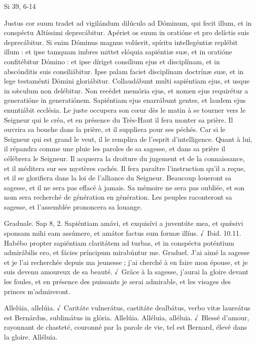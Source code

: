 \begin{paracol}{2}
Si 39, 6-14
\switchcolumn

\switchcolumn*

Justus cor suum tradet ad  vigilándum dilúculo ad Dóminum, qui fecit illum, et in conspéctu Altíssimi deprecábitur. Apériet os suum in oratióne et pro delíctis suis deprecábitur. Si enim Dóminus magnus volúerit, spíritu intellegéntiæ replébit illum : et ipse tamquam imbres mittet elóquia sapiéntiæ suæ, et in oratióne confitébitur Dómino : et ipse díriget consílium ejus et disciplínam, et in abscónditis suis consiliábitur. Ipse palam faciet disciplínam doctrínæ suæ, et in lege testaménti Dómini gloriábitur. Collaudábunt multi sapiéntiam ejus, et usque in sǽculum non delébitur. Non recédet memória ejus, et nomen ejus requirétur a generatióne in generatiónem. Sapiéntiam ejus enarrábunt gentes, et laudem ejus enuntiábit ecclésia.
\switchcolumn
Le juste occupera son cœur dès le matin  à se tourner vers le Seigneur qui le créa, et en présence du Très-Haut il fera monter sa prière. Il ouvrira sa bouche dans la prière, et il suppliera pour ses péchés. Car si le Seigneur qui est grand le veut, il le remplira de l’esprit d’intelligence. Quant à lui, il répandra comme une pluie les paroles de sa sagesse, et dans sa prière il célébrera le Seigneur. Il acquerra la droiture du jugement et de la connaissance, et il méditera sur ses mystères cachés. Il fera paraître l’instruction qu’il a reçue, et il se glorifiera dans la loi de l’alliance du Seigneur. Beaucoup loueront sa sagesse, et il ne sera pas effacé à jamais. Sa mémoire ne sera pas oubliée, et son nom sera recherché de génération en génération. Les peuples raconteront sa sagesse, et l’assemblée prononcera sa louange.
\switchcolumn*

Graduale. Sap 8, 2. Sapiéntiam amávi, et exquisívi a juventúte mea, et quǽsivi sponsam mihi eam assúmere, et amátor factus sum formæ illíus. √~Ibid. 10.11. Habébo propter sapiéntiam claritátem ad turbas, et in conspéctu poténtium admirábilis ero, et fácies príncipum mirabúntur me.
\switchcolumn
Graduel. J’ai aimé la sagesse et je l’ai recherchée depuis ma jeunesse ; j’ai cherché à en faire mon épouse, et je suis devenu amoureux de sa beauté. √~Grâce à la sagesse, j’aurai la gloire devant les foules, et en présence des puissants je serai admirable, et les visages des princes m’admireront.
\switchcolumn*

Allelúia, allelúia. √~Caritáte vulnerátus, castitáte dealbátus, verbo vitæ laureátus est Bernárdus, sublimátus in glória. Allelúia.
\switchcolumn
Alléluia, alléluia. √~Blessé d’amour, rayonnant de chasteté, couronné par la parole de vie, tel est Bernard, élevé dans la gloire. Alléluia.
\switchcolumn*


\end{paracol}
